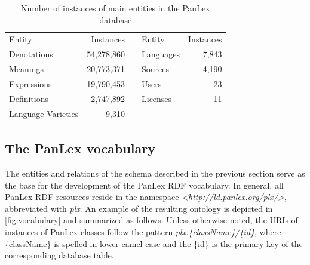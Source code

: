\documentclass[sw]{iosart2c}
\begin{document}
\begin{table}
  \centering\begin{scriptsize}
  \begin{tabular}{lrclr}
    Entity             & Instances  & & Entity    & Instances \\
    \cline{1-2}\cline{4-5}
    Denotations        & 54,278,860 & & Languages & 7,843     \\
    Meanings           & 20,773,371 & & Sources   & 4,190     \\
    Expressions        & 19,790,453 & & Users     &    23     \\
    Definitions        &  2,747,892 & & Licenses  &    11     \\
    Language Varieties &      9,310 & & & \\
  \end{tabular}
  \end{scriptsize}
  \caption{Number of instances of main entities in the PanLex database}
  \label{fig:plx-entity-counts}
\end{table}


\subsection{The PanLex vocabulary}
\label{sec:vocabulary}
The entities and relations of the schema described in the previous section serve as the base for the development of the PanLex RDF vocabulary.
In general, all PanLex RDF resources reside in the namespace \emph{<http://ld.panlex.org/plx/>}, abbreviated with \emph{plx}.
An example of the resulting ontology is depicted in \autoref{fig:vocabulary} and summarized as follows.
Unless otherwise noted, the URIs of instances of PanLex classes follow the pattern \emph{plx:\{className\}/\{id\}}, where \{className\} is spelled in lower camel case and the \{id\} is the primary key of the corresponding database table.
\end{document}
